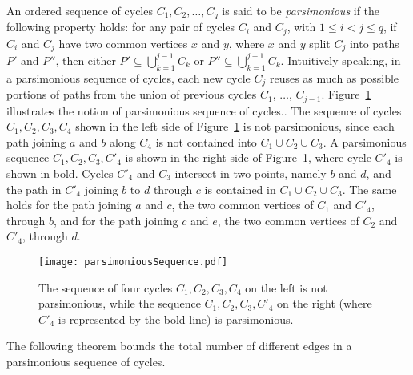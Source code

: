 \documentclass{article}
\newcommand{\nota}[1]{\textbf{(*)}\marginpar {\tiny \raggedright{(*) #1}}}
\newcommand{\commento}[1] {}
\begin{document}
\commento
{
\nota{verificare se servono ancora le definizioni seguenti}\nota{PGF: viene usato solo $\Gamma_e$ in un paio di occasioni, si pu\`o definire direttamente l'insieme degli short cycles $\Gamma_e$. Lasciamo quest modifica a dopo la fine di questa passata, algoritmi compresi}
Recall from Section~\ref{se:preliminary}
that we denote by $\Gamma_e(G)$ the set of short cycles for $e$ in graph $G$,
and by $\Pi_{e}(x,y)$ (respectively $\Pi_{\overline{e}}(x,y)$)
the set of shortest paths in ${\cal P}_{e}(x,y)$ (respectively ${\cal P}_{\overline{e}}(x,y)$).
}






An ordered sequence of cycles $C_1, C_2, \ldots, C_q$ is said to be \emph{parsimonious} if the following property holds: for any pair of cycles $C_i$ and $C_j$, with $1\leq i < j \leq q$, if $C_i$ and $C_j$ have two common vertices $x$ and $y$, where $x$ and $y$ split $C_j$ into paths $P'$ and $P''$, then either 
$P' \subseteq \bigcup_{k=1}^{j-1} C_k$ or $P'' \subseteq \bigcup_{k=1}^{j-1} C_k$.
Intuitively speaking, in a parsimonious sequence of cycles, each new cycle $C_j$ reuses as much as possible portions of paths from the union of previous cycles $C_1$, $\ldots$, $C_{j-1}$.
Figure~\ref{fi:parsimonious} illustrates the notion of parsimonious sequence of cycles..
The sequence of cycles $C_1, C_2, C_3, C_4$ shown in the left side of Figure~\ref{fi:parsimonious} is not parsimonious, since each path joining $a$ and $b$ along $C_4$ is not contained into $C_1 \cup C_2 \cup C_3$.
A parsimonious sequence $C_1, C_2, C_3, C'_4$ is shown in the right side of Figure~\ref{fi:parsimonious}, where cycle $C'_4$ is shown in bold. Cycles $C'_4$ and $C_3$ intersect in two points, namely $b$ and $d$, and the path in $C'_4$ joining $b$ to $d$ through $c$ is contained in $C_1 \cup C_2 \cup C_3$. The same holds for the path joining $a$ and $c$, the two common  vertices of $C_1$ and $C'_4$, through $b$, and for the path joining $c$ and $e$, the two common vertices of $C_2$ and $C'_4$, through $d$.

\begin{figure}[t]
\begin{center}
\texttt{[image: parsimoniousSequence.pdf]}
\end{center}
\caption{The sequence of four cycles $C_1, C_2, C_3, C_4$ on the left is not parsimonious, while the sequence $C_1, C_2, C_3, C'_4$ on the right (where $C'_4$ is represented by the bold line) is parsimonious.}
\protect\label{fi:parsimonious}
\end{figure}
The following theorem bounds the total number of different edges in a parsimonious sequence of cycles.
\end{document}
